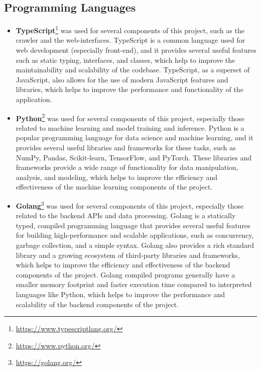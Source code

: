 \subsection{Programming Languages}\label{subsec:programming_languages}

\begin{itemize}
    \item \textbf{TypeScript}\footnote{\url{https://www.typescriptlang.org/}} was used for several components of this project, such as the crawler and the web-interfaces.
    TypeScript is a common language used for web development (especially front-end), and it provides several useful features such as static typing, interfaces, and classes, which help to improve the maintainability and scalability of the codebase.
    TypeScript, as a superset of JavaScript, also allows for the use of modern JavaScript features and libraries, which helps to improve the performance and functionality of the application.

    \item \textbf{Python}\footnote{\url{https://www.python.org/}} was used for several components of this project, especially those related to machine learning and model training and inference.
    Python is a popular programming language for data science and machine learning, and it provides several useful libraries and frameworks for these tasks, such as NumPy, Pandas, Scikit-learn, TensorFlow, and PyTorch.
    These libraries and frameworks provide a wide range of functionality for data manipulation, analysis, and modeling, which helps to improve the efficiency and effectiveness of the machine learning components of the project.

    \item \textbf{Golang}\footnote{\url{https://golang.org/}} was used for several components of this project, especially those related to the backend APIs and data processing.
    Golang is a statically typed, compiled programming language that provides several useful features for building high-performance and scalable applications, such as concurrency, garbage collection, and a simple syntax.
    Golang also provides a rich standard library and a growing ecosystem of third-party libraries and frameworks, which helps to improve the efficiency and effectiveness of the backend components of the project.
    Golang compiled programs generally have a smaller memory footprint and faster execution time compared to interpreted languages like Python, which helps to improve the performance and scalability of the backend components of the project.
\end{itemize}

